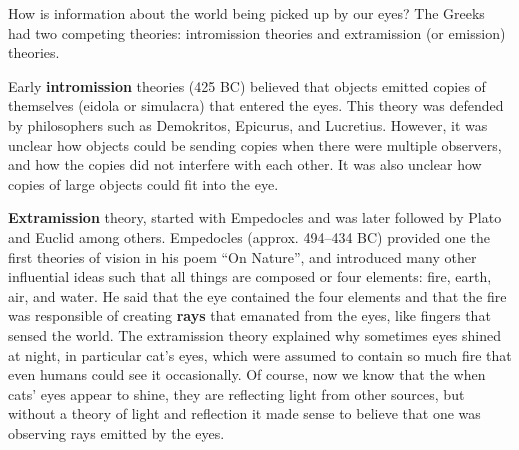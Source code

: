 How is information about the world being picked up by our eyes?
The Greeks had two competing theories: intromission theories and extramission (or emission) theories.


Early {\bf intromission} 
theories (425 BC) believed that objects emitted copies of themselves (eidola or simulacra) that entered the eyes. This theory was defended by philosophers such as Demokritos, Epicurus, and Lucretius. However, it was unclear how objects could be sending copies when there were multiple observers, and how the copies did not interfere with each other. It was also unclear how copies of large objects could fit into the eye.

    {\bf Extramission} theory, started with Empedocles \cite{kalderon2015form} and was later followed by Plato and Euclid among others. Empedocles (approx. 494--434 BC) provided one the first theories of vision in his poem ``On Nature'', and introduced many other influential ideas such that all things are composed or four elements: fire, earth, air, and water. He said that the eye contained the four elements and that the fire was responsible of creating {\bf rays} that emanated from the eyes, like fingers that sensed the world. The extramission theory explained why sometimes eyes shined at night, in particular cat's eyes, which were assumed to contain so much fire that even humans could see it occasionally. Of course, now we know that the when cats' eyes appear to shine, they
are reflecting light from other sources, but without a theory of light and reflection it made sense to believe that one was observing rays emitted by the eyes.

